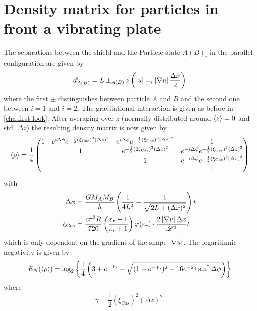 \section{Density matrix for particles in front a vibrating plate} \label{apx:density-matrix-vibrating-plate}
The separations between the shield and the Particle state $A(B)_i$ in the parallel configuration are given by
\begin{equation}
  d^i_{A(B)} = L \pm_{A(B)} z \left(\left\lvert u\right\rvert \mp_i \left\lvert\nabla u\right\rvert \frac{\Delta x}{2}\right)
\end{equation}
where the first $\pm$ distinguishes between particle $A$ and $B$ and the second one between $i=1$ and $i=2$. The gravitational interaction is given as before in \cref{cha:first-look}.
After averaging over $z$ (normally distributed around $\left\langle z\right\rangle = 0$ and std. $\Delta z$) the resulting density matrix is now given by
\begin{equation}
  \left\langle\rho\right\rangle = \frac{1}{4} \begin{pmatrix}
    1 & e^{i \Delta \phi} e^{- \frac{1}{2} (\xi_\mathrm{Cas})^2 (\Delta z)^2} & e^{i \Delta \phi} e^{- \frac{1}{2} (\xi_\mathrm{Cas})^2 (\Delta z)^2} & 1 \\
    & 1 & e^{- \frac{1}{2} (2 \xi_\mathrm{Cas})^2 (\Delta z)^2} & e^{-i \Delta \phi} e^{- \frac{1}{2} (\xi_\mathrm{Cas})^2(\Delta z)^2} \\
    & & 1 & e^{-i \Delta \phi} e^{- \frac{1}{2} (\xi_\mathrm{Cas})^2 (\Delta z)^2} \\
    & & & 1
  \end{pmatrix}
\end{equation}
with
\begin{align}
  \Delta \phi &= \frac{G M_A M_B}{\hbar} \left(\frac{1}{4L^2} - \frac{1}{\sqrt{2L + (\Delta x)^2}}\right) t \\
  \xi_\mathrm{Cas} &= \frac{c \pi^3 R}{720} \left(\frac{\varepsilon_r - 1}{\varepsilon_r + 1}\right)\varphi(\varepsilon_r)\cdot \frac{2 \left\lvert\nabla u\right\rvert \Delta x}{\mathscr{L}^3} t
\end{align}
which is only dependent on the gradient of the shape $\left\lvert\nabla u\right\rvert$.
The logarithmic negativity is given by
\begin{equation}\label{eq:apx:en-thermal-shield}
  E_N(\left\langle\rho\right\rangle) = \log_2\left\{\frac{1}{4}\left(3 + e^{-4 \gamma}+\sqrt{(1-e^{-4\gamma})^2 + 16e^{-2\gamma}\sin^2\Delta\phi}\right)\right\}
\end{equation}
where 
\begin{equation}
  \gamma = \frac{1}{2}(\xi_\mathrm{Cas})^2(\Delta z)^2 .
\end{equation}


